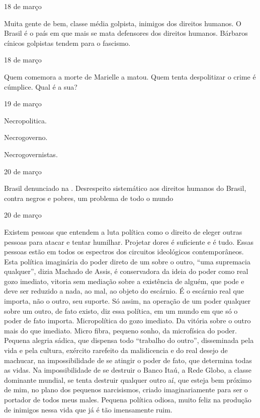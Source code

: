 \begin{flushright}
18 de março
\end{flushright}

Muita gente de bem, classe média golpista, inimigos dos direitos
humanos. O Brasil é o país em que mais se mata defensores dos direitos
humanos. Bárbaros cínicos golpistas tendem para o fascismo.

\begin{flushright}
18 de março
\end{flushright}

Quem comemora a morte de Marielle a matou. Quem tenta despolitizar o
crime é cúmplice. Qual é a sua?

\begin{flushright}
19 de março
\end{flushright}

Necropolitica.

Necrogoverno.

Necrogovernistas.

\begin{flushright}
20 de março
\end{flushright}

Brasil denunciado na . Desrespeito sistemático aos direitos humanos
do Brasil, contra negros e pobres, um problema de todo o mundo

\begin{flushright}
20 de março
\end{flushright}

Existem pessoas que entendem a luta política como o direito de eleger
outras pessoas para atacar e tentar humilhar. Projetar dores é
suficiente e é tudo. Essas pessoas estão em todos os espectros dos
circuitos ideológicos contemporâneos. Esta política imaginária do poder
direto de um sobre o outro, ``uma supremacia qualquer'', dizia Machado
de Assis, é conservadora da ideia do poder como real gozo imediato,
vitoria sem mediação sobre a existência de alguém, que pode e deve ser
reduzido a nada, ao mal, ao objeto do escárnio. É o escárnio real que
importa, não o outro, seu suporte. Só assim, na operação de um poder
qualquer sobre um outro, de fato existo, diz essa política, em um mundo
em que só o poder de fato importa. Micropolítica do gozo imediato. Da
vitória sobre o outro mais do que imediato. Micro fibra, pequeno sonho,
da microfísica do poder. Pequena alegria sádica, que dispensa todo
``trabalho do outro'', disseminada pela vida e pela cultura, exército
rarefeito da malidicencia e do real desejo de machucar, na
impossibilidade de se atingir o poder de fato, que determina todas as
vidas. Na impossibilidade de se destruir o Banco Itaú, a Rede Globo, a
classe dominante mundial, se tenta destruir qualquer outro aí, que
esteja bem próximo de mim, no plano dos pequenos narcisismos, criado
imaginariamente para ser o portador de todos meus males. Pequena
política odiosa, muito feliz na produção de inimigos nessa vida que já é
tão imensamente ruim.

